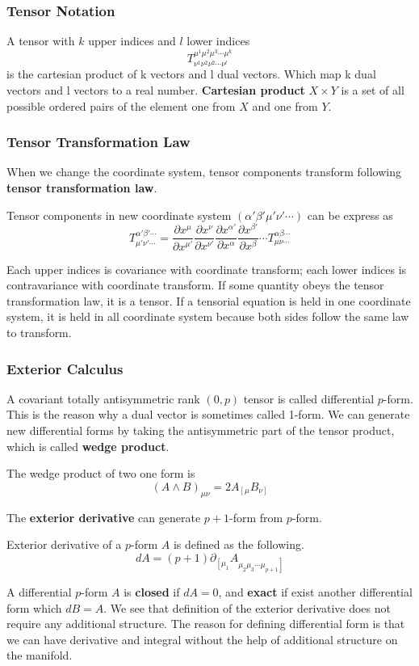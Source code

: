 \documentclass[12pt]{article}
\theoremstyle{mystyle}{\newtheorem{definition}{Definition}[subsection]}
\theoremstyle{mystyle}{\newtheorem{theorem}[definition]{Theorem}}
\theoremstyle{mystyle}{\newtheorem*{remark}{Remark}}
\theoremstyle{mystyle}{\newtheorem{example}{Example}[subsection]}
\theoremstyle{mystyle}{\newtheorem{examples}{Examples}[subsection]}
\theoremstyle{mystyle}{\newtheorem{cthm}{}[subsection]}
\begin{document}
\subsubsection{Tensor Notation}
A tensor with \(k\) upper indices and \(l\) lower indices
\[T^{\mu^1 \mu^2 \mu^3 \cdots \mu^k}_{\nu^1\nu^2\nu^2\cdots \nu^l}\]
is the cartesian product of k vectors and l dual vectors. Which map k dual vectors and l vectors to a real number.
\textbf{Cartesian product} $X \times Y$ is a set of all possible ordered pairs of the element one from $X$ and one from $Y$.

\subsubsection{Tensor Transformation Law}
When we change the coordinate system, tensor components transform following \textbf{tensor transformation law}.
\begin{definition}
  Tensor components in new coordinate system \((\alpha'\beta'\mu'\nu'\cdots)\) can be express as
  \[T^{\alpha'\beta'\cdots}_{\mu'\nu'\cdots} =
    \frac{\partial x^{\mu}}{\partial x^{\mu'}}\frac{\partial x^{\nu}}{\partial x^{\nu'}}\frac{\partial x^{\alpha'}}{\partial x^{\alpha}}
    \frac{\partial x^{\beta'}}{\partial x^{\beta}} \cdots
    T^{\alpha\beta\cdots}_{\mu\nu\cdots}\]
\end{definition}
Each upper indices is covariance with coordinate transform; each lower indices is contravariance with coordinate transform.
If some quantity obeys the tensor transformation law, it is a tensor. If a tensorial equation is held in one coordinate system,
it is held in all coordinate
system because both sides follow the same law to transform.

\subsubsection{Exterior Calculus}
A covariant totally antisymmetric rank \((0,p)\) tensor is called differential \(p\)-form. This is the reason why a dual vector is sometimes called 1-form.
We can generate new differential forms by taking the antisymmetric part of the tensor product, which is called \textbf{wedge product}.
\begin{example}
  The wedge product of two one form is \[(A\wedge B)_{\mu\nu}= 2A_{\left[\mu\right.}B_{\left.\nu\right]}\]
\end{example}
The \textbf{exterior derivative} can generate \(p+1\)-form from \(p\)-form.
\begin{definition}
  Exterior derivative of a \(p\)-form \(A\) is defined as the following.
  \[dA = (p+1)\partial_{\left[\mu_1\right.}A_{\left.\mu_2\mu_3\cdots\mu_{p+1}\right]}\]
\end{definition}
A differential \(p\)-form \(A\) is \textbf{closed} if \(dA =0\), and \textbf{exact} if exist another differential form which \(dB = A\).
We see that definition of the exterior derivative does not require any additional structure.
The reason for defining differential form is that we can have derivative and integral without the help of additional structure on the manifold.
\end{document}
